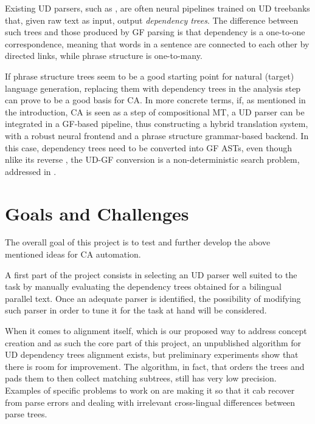 \documentclass{article}
\begin{document}
Existing UD parsers, such as \cite{udparsing}, are often neural pipelines trained on UD treebanks that, given raw text as input, output \textit{dependency trees}. The difference between such trees and those produced by GF parsing is that dependency is a one-to-one correspondence, meaning that words in a sentence are connected to each other by directed links, while phrase structure is one-to-many. %

If phrase structure trees seem to be a good starting point for natural (target) language generation, replacing them with dependency trees in the analysis step can prove to be a good basis for CA.
In more concrete terms, if, as mentioned in the introduction, CA is seen as a step of compositional MT, a UD parser can be integrated in a GF-based pipeline, thus constructing a hybrid translation system, with a robust neural frontend and a phrase structure grammar-based backend. 
In this case, dependency trees need to be converted into GF ASTs, even though nlike its reverse \cite{gfud}, the UD-GF conversion is a non-deterministic search problem, addressed in \cite{udgf}. 

\section{Goals and Challenges}
The overall goal of this project is to test and further develop the above mentioned ideas for CA automation. 

A first part of the project consists in selecting an UD parser well suited to the task by manually evaluating the dependency trees obtained for a bilingual parallel text. Once an adequate parser is identified, the possibility of modifying such parser in order to tune it for the task at hand will be considered.

When it comes to alignment itself, which is our proposed way to address concept creation and as such the core part of this project, an unpublished algorithm for UD dependency trees alignment exists, but preliminary experiments show that there is room for improvement. The algorithm, in fact, that orders the trees and pads them to then collect matching subtrees, still has very low precision. Examples of specific problems to work on are making it so that it cab recover from parse errors and dealing with irrelevant cross-lingual differences between parse trees.
\end{document}
